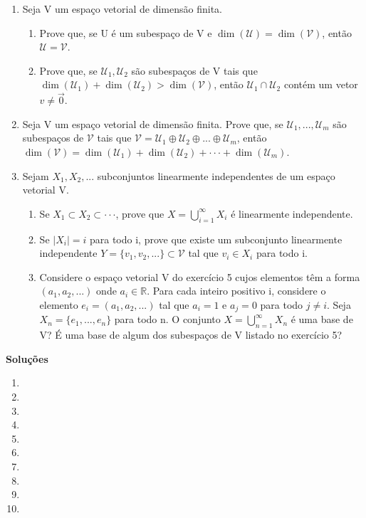 \documentclass[12pt]{article}
\begin{document}
\begin{enumerate}
    \item Seja V um espaço vetorial de dimensão finita.
    \begin{enumerate}
        \item Prove que, se U é um subespaço de V e $\dim (\mathcal{U}) = \dim (\mathcal{V})$, então $\mathcal{U}=\mathcal{V}$.
        \item Prove que, se $\mathcal{U}_{1}, \mathcal{U}_{2}$ são subespaços de V tais que $\dim (\mathcal{U}_{1}) + \dim (\mathcal{U}_{2}) > \dim (\mathcal{V})$, então $\mathcal{U}_{1} \cap \mathcal{U}_{2}$ contém um vetor $v \ne \vec{0}$.
    \end{enumerate}

    \item Seja V um espaço vetorial de dimensão finita. Prove que, se $\mathcal{U}_{1},...,\mathcal{U}_{m}$ são subespaços de $\mathcal{V}$ tais que $\mathcal{V} = \mathcal{U}_{1} \oplus \mathcal{U}_{2} \oplus ... \oplus \mathcal{U}_{m}$, então $\dim (\mathcal{V}) = \dim (\mathcal{U}_{1}) + \dim (\mathcal{U}_{2}) + \cdot\cdot\cdot + \dim (\mathcal{U}_{m})$.

    \item Sejam $X_{1}, X_{2}, ...$ subconjuntos linearmente independentes de um espaço vetorial V.
    \begin{enumerate}
        \item Se $X_{1} \subset X_{2} \subset \cdot\cdot\cdot$, prove que $X=\bigcup_{i=1}^{\infty}X_{i}$ é linearmente independente.
        \item Se $|X_{i}|=i$ para todo i, prove que existe um subconjunto linearmente independente $Y=\{v_{1},v_{2},...\} \subset \mathcal{V}$ tal que $v_{i} \in X_{i}$ para todo i.
        \item Considere o espaço vetorial V do exercício 5 cujos elementos têm a forma $(a_{1},a_{2},...)$ onde $a_{i} \in \mathbb{R}$. Para cada inteiro positivo i, considere o elemento $e_{i}=(a_{1},a_{2},...)$ tal que $a_{i}=1$ e $a_{j}=0$ para todo $j \ne i$. Seja $X_{n}=\{e_{1},...,e_{n}\}$ para todo n. O conjunto $X=\bigcup_{n=1}^{\infty}X_{n}$ é uma base de V? É uma base de algum dos subespaços de V listado no exercício 5?
    \end{enumerate}

\end{enumerate}

\begin{center}
    \textbf{Soluções}
\end{center}

\begin{enumerate}
    \item[\textbf{E1}]
    \item[\textbf{E2}]
    \item[\textbf{E3}]
    \item[\textbf{E4}]
    \item[\textbf{E5}]
    \item[\textbf{E6}]
    \item[\textbf{E7}]
    \item[\textbf{E8}]
    \item[\textbf{E9}]
    \item[\textbf{E10}]
\end{enumerate}
\end{document}
